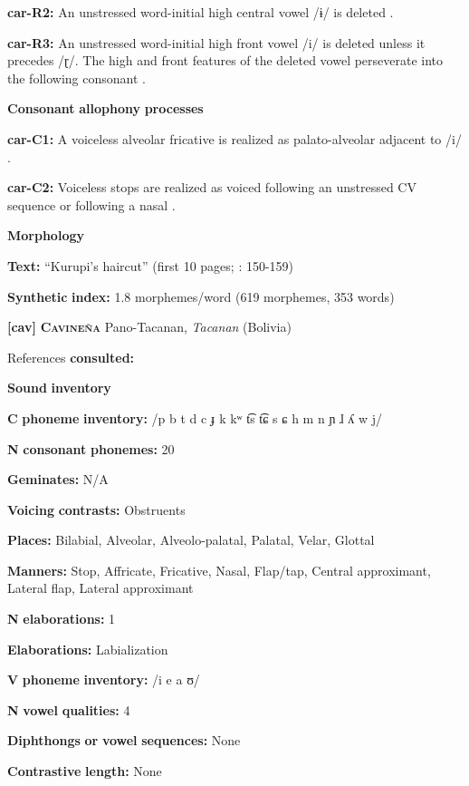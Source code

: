\begin{styleBody}
\textbf{car-R2:} An unstressed word-initial high central vowel /ɨ/ is deleted \citep[40]{Courtz2008}.

\textbf{car-R3:} An unstressed word-initial high front vowel /i/ is deleted unless it precedes /ɽ/. The high and front features of the deleted vowel perseverate into the following consonant \citep[41]{Courtz2008}.

\textbf{Consonant} \textbf{allophony} \textbf{processes}

\textbf{car-C1:} A voiceless alveolar fricative is realized as palato-alveolar adjacent to /i/ \citep[32]{Courtz2008}.

\textbf{car-C2:} Voiceless stops are realized as voiced following an unstressed CV sequence or following a nasal \citep[31]{Courtz2008}.

\textbf{Morphology}

\textbf{Text:} “Kurupi’s haircut” (first 10 pages; \citealt{Courtz2008}: 150-159)

\textbf{Synthetic} \textbf{index:} 1.8 morphemes/word (619 morphemes, 353 words)

\textbf{[cav]}   \textbf{\textsc{Cavineña}  }  Pano-Tacanan, \textit{Tacanan} (Bolivia)

References \textbf{consulted:} \citet{Guillaume2008}

\textbf{Sound} \textbf{inventory}

\textbf{C} \textbf{phoneme} \textbf{inventory:} /p b t d c ɟ k kʷ t͡s t͡ɕ s ɕ h m n ɲ ɺ ʎ w j/

\textbf{N} \textbf{consonant} \textbf{phonemes:} 20

\textbf{Geminates:} N/A

\textbf{Voicing} \textbf{contrasts:} Obstruents

\textbf{Places:} Bilabial, Alveolar, Alveolo-palatal, Palatal, Velar, Glottal

\textbf{Manners:} Stop, Affricate, Fricative, Nasal, Flap/tap, Central approximant, Lateral flap, Lateral approximant

\textbf{N} \textbf{elaborations:} 1

\textbf{Elaborations:} Labialization

\textbf{V} \textbf{phoneme} \textbf{inventory:} /i e a ʊ/

\textbf{N} \textbf{vowel} \textbf{qualities:} 4

\textbf{Diphthongs} \textbf{or} \textbf{vowel} \textbf{sequences:} None

\textbf{Contrastive} \textbf{length:} None


\end{styleBody}
